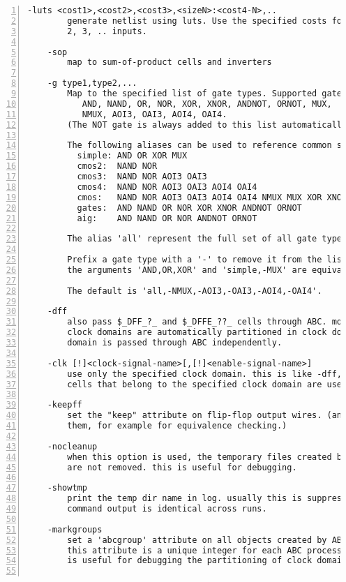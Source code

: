 \begin{lstlisting}[numbers=left,frame=single]
    -luts <cost1>,<cost2>,<cost3>,<sizeN>:<cost4-N>,..
        generate netlist using luts. Use the specified costs for luts with 1,
        2, 3, .. inputs.

    -sop
        map to sum-of-product cells and inverters

    -g type1,type2,...
        Map to the specified list of gate types. Supported gates types are:
           AND, NAND, OR, NOR, XOR, XNOR, ANDNOT, ORNOT, MUX,
           NMUX, AOI3, OAI3, AOI4, OAI4.
        (The NOT gate is always added to this list automatically.)

        The following aliases can be used to reference common sets of gate types:
          simple: AND OR XOR MUX
          cmos2:  NAND NOR
          cmos3:  NAND NOR AOI3 OAI3
          cmos4:  NAND NOR AOI3 OAI3 AOI4 OAI4
          cmos:   NAND NOR AOI3 OAI3 AOI4 OAI4 NMUX MUX XOR XNOR
          gates:  AND NAND OR NOR XOR XNOR ANDNOT ORNOT
          aig:    AND NAND OR NOR ANDNOT ORNOT

        The alias 'all' represent the full set of all gate types.

        Prefix a gate type with a '-' to remove it from the list. For example
        the arguments 'AND,OR,XOR' and 'simple,-MUX' are equivalent.

        The default is 'all,-NMUX,-AOI3,-OAI3,-AOI4,-OAI4'.

    -dff
        also pass $_DFF_?_ and $_DFFE_??_ cells through ABC. modules with many
        clock domains are automatically partitioned in clock domains and each
        domain is passed through ABC independently.

    -clk [!]<clock-signal-name>[,[!]<enable-signal-name>]
        use only the specified clock domain. this is like -dff, but only FF
        cells that belong to the specified clock domain are used.

    -keepff
        set the "keep" attribute on flip-flop output wires. (and thus preserve
        them, for example for equivalence checking.)

    -nocleanup
        when this option is used, the temporary files created by this pass
        are not removed. this is useful for debugging.

    -showtmp
        print the temp dir name in log. usually this is suppressed so that the
        command output is identical across runs.

    -markgroups
        set a 'abcgroup' attribute on all objects created by ABC. The value of
        this attribute is a unique integer for each ABC process started. This
        is useful for debugging the partitioning of clock domains.


\end{lstlisting}
